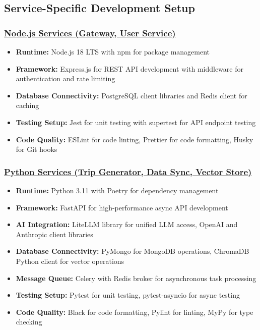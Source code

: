 \subsection{Service-Specific Development Setup}

\subsubsection*{\underline{Node.js Services (Gateway, User Service)}}
\begin{itemize}
    \item \textbf{Runtime:} Node.js 18 LTS with npm for package management
    \item \textbf{Framework:} Express.js for REST API development with middleware for authentication and rate limiting
    \item \textbf{Database Connectivity:} PostgreSQL client libraries and Redis client for caching
    \item \textbf{Testing Setup:} Jest for unit testing with supertest for API endpoint testing
    \item \textbf{Code Quality:} ESLint for code linting, Prettier for code formatting, Husky for Git hooks
\end{itemize}

\subsubsection*{\underline{Python Services (Trip Generator, Data Sync, Vector Store)}}
\begin{itemize}
    \item \textbf{Runtime:} Python 3.11 with Poetry for dependency management
    \item \textbf{Framework:} FastAPI for high-performance async API development
    \item \textbf{AI Integration:} LiteLLM library for unified LLM access, OpenAI and Anthropic client libraries
    \item \textbf{Database Connectivity:} PyMongo for MongoDB operations, ChromaDB Python client for vector operations
    \item \textbf{Message Queue:} Celery with Redis broker for asynchronous task processing
    \item \textbf{Testing Setup:} Pytest for unit testing, pytest-asyncio for async testing
    \item \textbf{Code Quality:} Black for code formatting, Pylint for linting, MyPy for type checking
\end{itemize}


